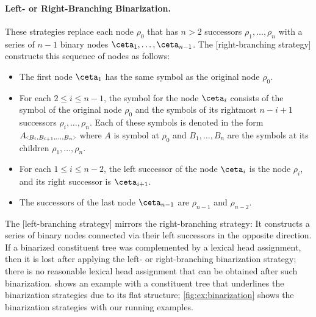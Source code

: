 \documentclass[../../document.tex]{subfiles}
\begin{document}
    \paragraph{Left- or Right-Branching Binarization.}
    These strategies replace each node \(\rho_0\) that has \( n>2 \) successors \(\rho_1, \ldots, \rho_n\) with a series of \( n-1 \) binary nodes \(\ceta_1, \ldots, \ceta_{n-1}\).
    The [right-branching strategy]  constructs this sequence of nodes as follows:
    \begin{itemize}
        \item The first node \(\ceta_1\) has the same symbol as the original node \(\rho_0\).
        \item For each \(2 \leq i \leq n-1\), the symbol for the node \(\ceta_i\) consists of the symbol of the original node \(\rho_0\) and the symbols of its rightmost \(n-i+1\) successors \(\rho_{i}, \ldots, \rho_n\). Each of these symbols is denoted in the form \(A\binsym{B_i,B_{i+1},\ldots,B_n}\) where \(A\) is symbol at \(\rho_0\) and \(B_1, \ldots, B_n\) are the symbols at its children \(\rho_1, \ldots, \rho_n\).
        \item For each \(1 \leq i \leq n-2\), the left successor of the node \(\ceta_i\) is the node \(\rho_i\), and its right successor is \(\ceta_{i+1}\).
        \item The successors of the last node \(\ceta_{n-1}\) are \(\rho_{n-1}\) and \(\rho_{n-2}\).
    \end{itemize}
    The [left-branching strategy]  mirrors the right-branching strategy: It constructs a series of binary nodes connected via their left successors in the opposite direction.
    If a binarized constituent tree was complemented by a lexical head assignment, then it is lost after applying the left- or right-branching binarization strategy; there is no reasonable lexical head assignment that can be obtained after such binarization.
     shows an example with a constituent tree that underlines the binarization strategies due to its flat structure; \cref{fig:ex:binarization} shows the binarization strategies with our running examples.
\end{document}
